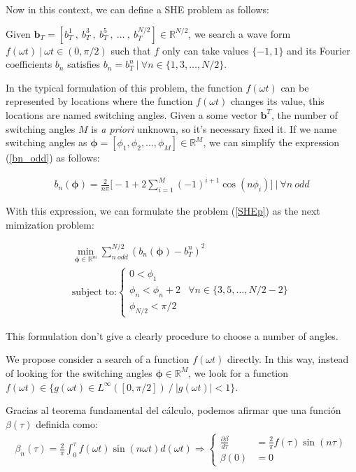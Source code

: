 Now in this context, we can define a SHE problem as follows:

\begin{problem}\label{SHEp}
    Given  $\bm{b}_T = [b^1_T \ , \ b^3_T \  , \ b^5_T \ , \ \dots \ , \ b^{N/2}_T] \in \mathbb{R}^{N/2}$, we search a wave form $f(\omega t ) \ | \ \omega t \in (0,\pi/2)$ such that $f$ only can take values  $\{-1,1\}$ and its Fourier coefficients $b_n$ satisfies $b_n=b_T^n \ | \ \forall n \in \{1,3,\dots,N/2 \}$. 
\end{problem}

In the typical formulation of this problem, the function $f(\omega t)$ can be represented by locations  where the function $f(\omega t)$ changes its value, this locations are named switching angles.
%
Given a some vector $\bm{b}^T$, the number of switching angles $M$ is \emph{a priori} unknown, so it's necessary fixed it. If we name switching angles as $\bm{\phi} = [\phi_1,\phi_2,\dots,\phi_M] \in \mathbb{R}^M $, we can simplify the expression (\ref{bn_odd}) as follows:

\begin{gather}
    b_n(\bm{\phi})  =  \frac{2}{n\pi  } \bigg[ -1 + 2\sum_{i=1}^M  (-1)^{i+1}\cos(n\phi_i) \bigg] \ | \ \forall n \ odd
\end{gather}

With this expression, we can formulate the problem (\ref{SHEp}) as the next mimization problem:

\begin{gather}
    \min_{\bm{\phi} \in \mathbb{R}^m} \sum_{n \ odd}^{N/2} (b_n(\bm{\phi}) - b^n_T)^2 \\
    \text{subject to:} \begin{cases}
        0 < \phi_1  \\
        \phi_n < \phi_n+2 &  \forall n \in \{3,5,\dots,N/2-2 \}\\
        \phi_{N/2} < \pi/2
    \end{cases}
\end{gather}

This formulation don't give a clearly procedure to choose a number of angles.
\newpage

We propose consider a search of a function $f(\omega t)$ directly. In this way, instead of looking for the switching angles $\bm{\phi} \in \mathbb{R}^M$, we look for a function $f(\omega t) \in \{ g(\omega t)  \in L^\infty([0,\pi/2])\ /\ |g(\omega t)| < 1\} $. 

Gracias al teorema fundamental del cálculo, podemos afirmar que una función $\beta(\tau)$ definida como:
\begin{gather}
    \beta_n(\tau) = \frac{2}{\pi}\int_0^\tau f(\omega t) \sin(n\omega t)d(\omega t) 
    \Rightarrow
    \begin{cases} \label{ode}
        \frac{\partial \beta}{d\tau} & = \frac{2}{\pi}f(\tau)\sin(n\tau) \\  
        \beta(0) & = 0       
    \end{cases}
\end{gather}


